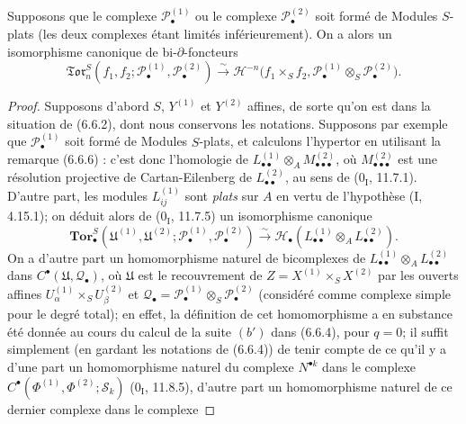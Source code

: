 \begin{proposition}[6.7.6]
Supposons que le complexe $\mathscr P_\bullet^{(1)}$ ou le complexe
$\mathscr P_\bullet^{(2)}$ soit formé de Modules $S$-plats (les deux complexes
étant limités inférieurement). On a alors un isomorphisme canonique de
bi-$\partial$-foncteurs
\[
  \mathfrak{Tor}_n^S
  (f_1,f_2;\mathscr P_\bullet^{(1)},\mathscr P_\bullet^{(2)})
  \xrightarrow{\sim}
  \mathscr H^{-n}\bigl(f_1\times_S f_2,
    \mathscr P_\bullet^{(1)}\otimes_S\mathscr P_\bullet^{(2)}\bigr).
  \tag{6.7.6.1}\label{III.6.7.6.1.fr}
\]
\end{proposition}

\begin{proof}
Supposons d'abord $S$, $Y^{(1)}$ et $Y^{(2)}$ affines, de sorte qu'on est
dans la situation de (6.6.2), dont nous conservons les notations. Supposons par
exemple que $\mathscr P_\bullet^{(1)}$ soit formé de Modules $S$-plats, et
calculons l'hypertor en utilisant la remarque (6.6.6) : c'est donc l'homologie
de $L_{\bullet\bullet}^{(1)}\otimes_A M_{\bullet\bullet\bullet}^{(2)}$, où
$M_{\bullet\bullet\bullet}^{(2)}$ est une résolution projective de
Cartan-Eilenberg de $L_{\bullet\bullet}^{(2)}$, au sens de
($0_{\mathrm I}$, 11.7.1). D'autre part, les modules
$L_{ij}^{(1)}$ sont \emph{plats} sur $A$ en vertu de l'hypothèse (I, 4.15.1);
on déduit alors de ($0_{\mathrm I}$, 11.7.5) un isomorphisme canonique
\[
  \mathbf{Tor}_\bullet^S
  (\mathfrak U^{(1)},\mathfrak U^{(2)};
   \mathscr P_\bullet^{(1)},\mathscr P_\bullet^{(2)})
  \xrightarrow{\sim}
  \mathscr H_\bullet
  (L_{\bullet\bullet}^{(1)}\otimes_A L_{\bullet\bullet}^{(2)}).
  \tag{6.7.6.2}\label{III.6.7.6.2.fr}
\]
On a d'autre part un homomorphisme naturel de bicomplexes de
$L_{\bullet\bullet}^{(1)}\otimes_A L_{\bullet\bullet}^{(2)}$ dans
$C^\bullet(\mathfrak U,\mathscr Q_\bullet)$, où $\mathfrak U$ est le
recouvrement de $Z=X^{(1)}\times_S X^{(2)}$ par les ouverts affines
$U_\alpha^{(1)}\times_S U_\beta^{(2)}$ et
$\mathscr Q_\bullet
=\mathscr P_\bullet^{(1)}\otimes_S\mathscr P_\bullet^{(2)}$ (considéré comme
complexe simple pour le degré total); en effet, la définition de cet
homomorphisme a en substance été donnée au cours du calcul de la suite $(b')$
dans (6.6.4), pour $q=0$; il suffit simplement (en gardant les notations de
(6.6.4)) de tenir compte de ce qu'il y a d'une part un homomorphisme naturel
du complexe $N^{\bullet k}$ dans le complexe
$C^\bullet(\Phi^{(1)},\Phi^{(2)};\mathscr S_k)$
($0_{\mathrm I}$, 11.8.5), d'autre part un homomorphisme naturel de ce dernier
complexe dans le complexe

\end{proof}
